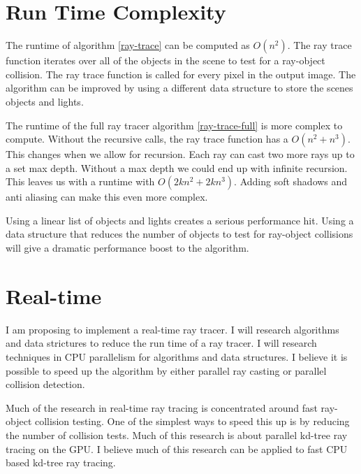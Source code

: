 \documentclass[11pt,a4paper,oneside]{article}
\begin{document}
\section{Run Time Complexity}
The runtime of algorithm \ref{ray-trace} can be computed as $O(n^2)$.    The ray trace function iterates over all of the objects in the scene to test for a ray-object collision.  The ray trace function is called for every pixel in the output image.   The algorithm can be improved by using a different data structure to store the scenes objects and lights.

The runtime of the full ray tracer algorithm \ref{ray-trace-full} is more complex to compute.  Without the recursive calls, the ray trace function has a $O(n^2 + n^3 )$.  This changes when we allow for recursion.  Each ray can cast two more rays up to a set max depth.  Without a max depth we could end up with infinite recursion.  This leaves us with a runtime with $O(2kn^2+2kn^3)$.  Adding soft shadows and anti aliasing can make this even more complex.

Using a linear list of objects and lights creates a serious performance hit.  Using a data structure that reduces the number of objects to test for ray-object collisions will give a dramatic performance boost to the algorithm.


\section{Real-time}
I am proposing to implement a real-time ray tracer.  I will research algorithms and data strictures to reduce the run time of a ray tracer.  I will research techniques in CPU parallelism for algorithms and data structures.  I believe it is possible to speed up the algorithm by either parallel ray casting or parallel collision detection.

Much of the research in real-time ray tracing is concentrated around fast ray-object collision testing.  One of the simplest ways to speed this up is by reducing the number of collision tests\cite{kd:2005}.
Much of this research is about parallel kd-tree ray tracing on the GPU\cite{kd:2007}\cite{fkd:2007}.  I believe much of this research can be applied to fast CPU based kd-tree ray tracing\cite{kd:2006}.

\newpage
\listofalgorithms
\listoffigures


\end{document}
